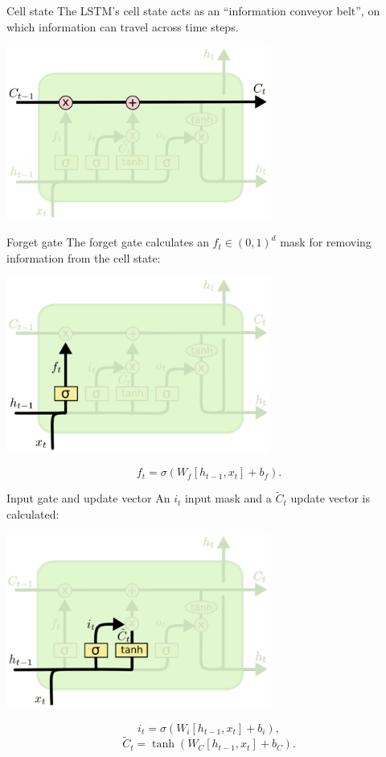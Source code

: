 \documentclass[style=upen, size=14pt]{powerdot}
\theoremstyle{definition}
\begin{document}
\begin{slide}{Cell state}
  The LSTM's cell state acts as an ``information conveyor belt'', on which
  information can travel across time steps.
  \begin{center}
    \includegraphics[width=0.65\textwidth]{figures/lstm_c_line.eps}
  \end{center}
\end{slide}

\begin{slide}{Forget gate}
  The forget gate calculates an $f_t\in (0,1)^d$ mask for removing information
  from the cell state:
  \begin{center}
    \includegraphics[width=0.65\textwidth]{figures/lstm_forget.eps}
  \end{center}
  $$
  f_t=\sigma(W_f[h_{t-1}, x_t] + b_f).
  $$
\end{slide}

\begin{slide}[toc=Input and update]{Input gate and update vector}
  An $i_t$ input mask and a $\tilde C_t$ update vector is calculated:
  \begin{center}
    \includegraphics[width=0.65\textwidth]{figures/lstm_update.eps}
  \end{center}
  $$
  i_t=\sigma(W_i[h_{t-1}, x_t] + b_i),
  $$
  $$
  \tilde C_t = \tanh(W_C[h_{t-1}, x_t] + b_C).
  $$
\end{slide}
\end{document}
